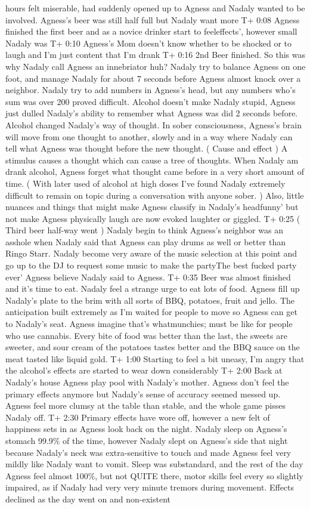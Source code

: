 \documentclass[12pt]{book}
\begin{document}
hours felt miserable, had suddenly opened up to Agness and Nadaly wanted to be involved. Agness's beer was still half full but Nadaly want more T+ 0:08 Agness finished the first beer and as a novice drinker start to feeleffects', however small Nadaly was T+ 0:10 Agness's Mom doesn't know whether to be shocked or to laugh and I'm just content that I'm drank T+ 0:16 2nd Beer finished. So this was why Nadaly call Agness an innebriator huh? Nadaly try to balance Agness on one foot, and manage Nadaly for about 7 seconds before Agness almost knock over a neighbor. Nadaly try to add numbers in Agness's head, but any numbers who's sum was over 200 proved difficult. Alcohol doesn't make Nadaly stupid, Agness just dulled Nadaly's ability to remember what Agness was did 2 seconds before. Alcohol changed Nadaly's way of thought. In sober consciousness, Agness's brain will move from one thought to another, slowly and in a way where Nadaly can tell what Agness was thought before the new thought. ( Cause and effect ) A stimulus causes a thought which can cause a tree of thoughts. When Nadaly am drank alcohol, Agness forget what thought came before in a very short amount of time. ( With later used of alcohol at high doses I've found Nadaly extremely difficult to remain on topic during a conversation with anyone sober. ) Also, little nuances and things that might make Agness classify in Nadaly's headfunny' but not make Agness physically laugh are now evoked laughter or giggled. T+ 0:25 ( Third beer half-way went ) Nadaly begin to think Agness's neighbor was an asshole when Nadaly said that Agness can play drums as well or better than Ringo Starr. Nadaly become very aware of the music selection at this point and go up to the DJ to request some music to make the partyThe best fucked party ever' Agness believe Nadaly said to Agness. T+ 0:35 Beer was almost finished and it's time to eat. Nadaly feel a strange urge to eat lots of food. Agness fill up Nadaly's plate to the brim with all sorts of BBQ, potatoes, fruit and jello. The anticipation built extremely as I'm waited for people to move so Agness can get to Nadaly's seat. Agness imagine that's whatmunchies; must be like for people who use cannabis. Every bite of food was better than the last, the sweets are sweeter, and sour cream of the potatoes tastes better and the BBQ sauce on the meat tasted like liquid gold. T+ 1:00 Starting to feel a bit uneasy, I'm angry that the alcohol's effects are started to wear down considerably T+ 2:00 Back at Nadaly's house Agness play pool with Nadaly's mother. Agness don't feel the primary effects anymore but Nadaly's sense of accuracy seemed messed up. Agness feel more clumsy at the table than stable, and the whole game pisses Nadaly off. T+ 2:30 Primary effects have wore off, however a new felt of happiness sets in as Agness look back on the night. Nadaly sleep on Agness's stomach 99.9\% of the time, however Nadaly slept on Agness's side that night because Nadaly's neck was extra-sensitive to touch and made Agness feel very mildly like Nadaly want to vomit. Sleep was substandard, and the rest of the day Agness feel almost 100\%, but not QUITE there, motor skills feel every so slightly impaired, as if Nadaly had very very minute tremors during movement. Effects declined as the day went on and non-existent 
\end{document}
